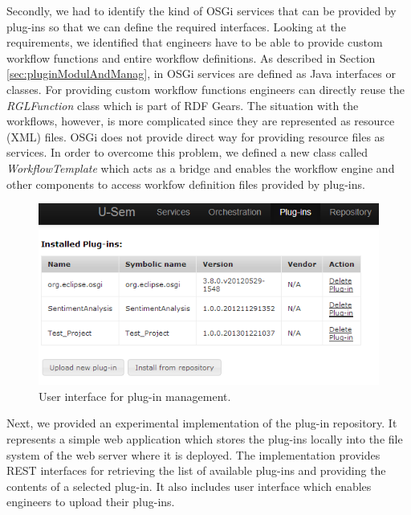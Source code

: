 Secondly, we had to identify the kind of OSGi services that can be provided by plug-ins so that we can define the required interfaces. Looking at the requirements, we identified that engineers have to be able to provide custom workflow functions and entire workflow definitions. As described in Section \ref{sec:pluginModulAndManag}, in OSGi services are defined as Java interfaces or classes. For providing custom workflow functions engineers can directly reuse the \textit{RGLFunction} class which is part of RDF Gears. The situation with the workflows, however, is more complicated since they are represented as resource (XML) files. OSGi does not provide direct way for providing resource files as services. In order to overcome this problem, we defined a new class called \textit{WorkflowTemplate} which acts as a bridge and enables the workflow engine and other components to access workfow definition files provided by plug-ins.

\begin{figure}[h!]
  \centering
  	\includegraphics[scale=0.70]{plug-in/ui/list.png}
  \caption{User interface for plug-in management.}
  \label{list_ui}
\end{figure}

Next, we provided an experimental implementation of the plug-in repository. It represents a simple web application which stores the plug-ins locally into the file system of the web server where it is deployed. The implementation provides REST interfaces for retrieving the list of available plug-ins and providing the contents of a selected plug-in. It also includes user interface which enables engineers to upload their plug-ins. 



